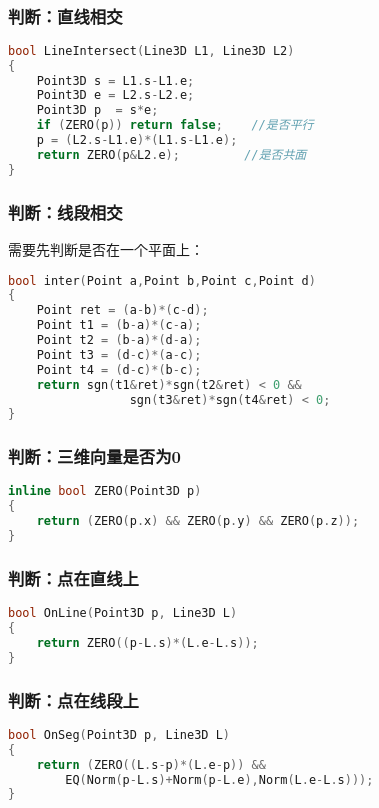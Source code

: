 　　
	\subsubsection{判断：直线相交}
		\begin{lstlisting}[language=c++]
bool LineIntersect(Line3D L1, Line3D L2) 
{ 
	Point3D s = L1.s-L1.e; 
	Point3D e = L2.s-L2.e; 
	Point3D p  = s*e; 
	if (ZERO(p)) return false;	  //是否平行 
	p = (L2.s-L1.e)*(L1.s-L1.e); 
	return ZERO(p&L2.e);		 //是否共面 
} 
		\end{lstlisting}
		
	\subsubsection{判断：线段相交}
	需要先判断是否在一个平面上：
	\begin{lstlisting}[language=c++]
bool inter(Point a,Point b,Point c,Point d)
{
	Point ret = (a-b)*(c-d);
	Point t1 = (b-a)*(c-a);
	Point t2 = (b-a)*(d-a);
	Point t3 = (d-c)*(a-c);
	Point t4 = (d-c)*(b-c);
	return sgn(t1&ret)*sgn(t2&ret) < 0 &&
				 sgn(t3&ret)*sgn(t4&ret) < 0;
}
	\end{lstlisting}
	
	\subsubsection{判断：三维向量是否为0}
		\begin{lstlisting}[language=c++]
inline bool ZERO(Point3D p)
{ 
	return (ZERO(p.x) && ZERO(p.y) && ZERO(p.z)); 
} 
		\end{lstlisting}
				
	\subsubsection{判断：点在直线上}
		\begin{lstlisting}[language=c++]
bool OnLine(Point3D p, Line3D L)
{ 
	return ZERO((p-L.s)*(L.e-L.s)); 
} 
		\end{lstlisting}
		
	\subsubsection{判断：点在线段上}
		\begin{lstlisting}[language=c++]
bool OnSeg(Point3D p, Line3D L)
{ 
	return (ZERO((L.s-p)*(L.e-p)) && 
		EQ(Norm(p-L.s)+Norm(p-L.e),Norm(L.e-L.s))); 
} 
		\end{lstlisting}
		
